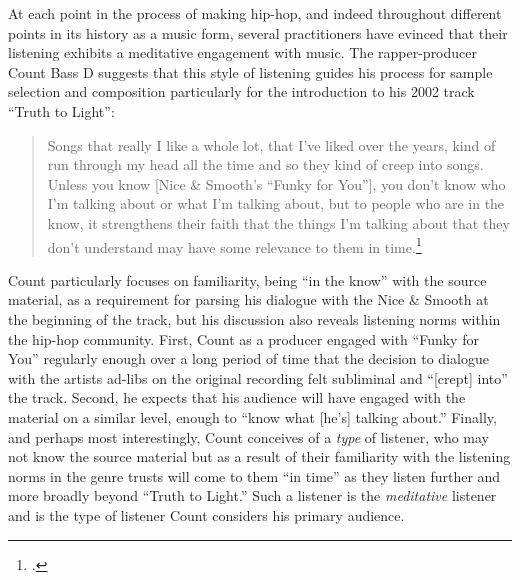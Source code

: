 At each point in the process of making hip-hop, and indeed throughout different points in
its history as a music form, several practitioners have evinced that their listening exhibits
a meditative engagement with music. The rapper-producer Count Bass D suggests that this style
of listening guides his process for sample selection and composition particularly for the
introduction to his 2002 track ``Truth to Light'': 
    \begin{quote}
        Songs that really I like a whole lot, that I've liked over the years, kind of run through my head all
        the time and so they kind of creep into songs. \textellipsis Unless you know [Nice \& Smooth's ``Funky
        for You''], you don't know who I'm talking about or what I'm talking about, but to people who are in
        the know, it strengthens their faith that the things I'm talking about that they don't understand may
        have some relevance to them in time.\footnote{\autocite[100]{mickeyhessHipHopDead2007}.}
    \end{quote}
Count particularly focuses on familiarity, being ``in the know'' with the source material, as
a requirement for parsing his dialogue with the Nice \& Smooth at the beginning of the track, but
his discussion also reveals listening norms within the hip-hop community. First, Count as a producer
engaged with ``Funky for You'' regularly enough over a long period of time that the decision to
dialogue with the artists ad-libs on the original recording felt subliminal and ``[crept] into''
the track. Second, he expects that his audience will have engaged with the material on a similar
level, enough to ``know what [he's] talking about.'' Finally, and perhaps most interestingly,
Count conceives of a \emph{type} of listener, who may not know the source material but as a
result of their familiarity with the listening norms in the genre trusts will come to them
``in time'' as they listen further and more broadly beyond ``Truth to Light.'' Such a
listener is the \emph{meditative} listener and is the type of listener Count considers
his primary audience.


